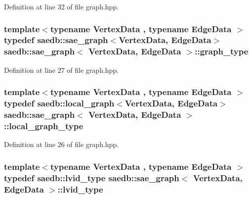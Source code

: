 Definition at line 32 of file graph.\-hpp.

\hypertarget{classsaedb_1_1sae__graph_a23007633d4d5ca206b659fd585777848}{
\subsubsection[{graph\-\_\-type}]{\setlength{\rightskip}{0pt plus 5cm}template$<$typename Vertex\-Data , typename Edge\-Data $>$ typedef {\bf saedb\-::sae\-\_\-graph}$<$Vertex\-Data, Edge\-Data$>$ {\bf saedb\-::sae\-\_\-graph}$<$ Vertex\-Data, Edge\-Data $>$\-::{\bf graph\-\_\-type}}}\label{d6/d2b/classsaedb_1_1sae__graph_a23007633d4d5ca206b659fd585777848}


Definition at line 27 of file graph.\-hpp.

\hypertarget{classsaedb_1_1sae__graph_a71b3f3108c15bb3af8362ba078d4cb06}{
\subsubsection[{local\-\_\-graph\-\_\-type}]{\setlength{\rightskip}{0pt plus 5cm}template$<$typename Vertex\-Data , typename Edge\-Data $>$ typedef {\bf saedb\-::local\-\_\-graph}$<$Vertex\-Data, Edge\-Data$>$ {\bf saedb\-::sae\-\_\-graph}$<$ Vertex\-Data, Edge\-Data $>$\-::{\bf local\-\_\-graph\-\_\-type}}}\label{d6/d2b/classsaedb_1_1sae__graph_a71b3f3108c15bb3af8362ba078d4cb06}


Definition at line 26 of file graph.\-hpp.

\hypertarget{classsaedb_1_1sae__graph_afcd2ad6444e374e40a7a5ee4c46be052}{
\subsubsection[{lvid\-\_\-type}]{\setlength{\rightskip}{0pt plus 5cm}template$<$typename Vertex\-Data , typename Edge\-Data $>$ typedef {\bf saedb\-::lvid\-\_\-type} {\bf saedb\-::sae\-\_\-graph}$<$ Vertex\-Data, Edge\-Data $>$\-::{\bf lvid\-\_\-type}}}\label{d6/d2b/classsaedb_1_1sae__graph_afcd2ad6444e374e40a7a5ee4c46be052}


